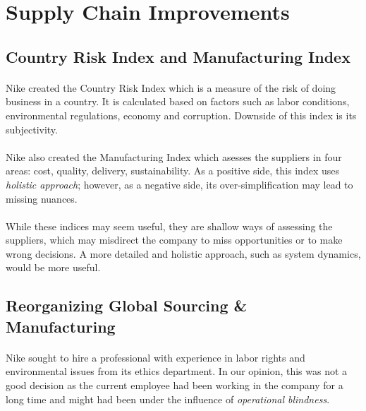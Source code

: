 \section{Supply Chain Improvements}

\subsection{Country Risk Index and Manufacturing Index}

\paragraph{} Nike created the Country Risk Index which is a measure of the risk of doing business in a country. It is calculated based on factors such as labor conditions, environmental regulations, economy and corruption. Downside of this index is its subjectivity.

\paragraph{} Nike also created the Manufacturing Index which asesses the suppliers in four areas: cost, quality, delivery, sustainability. As a positive side, this index uses \textit{holistic approach}; however, as a negative side, its over-simplification may lead to missing nuances.

\paragraph{} While these indices may seem useful, they are shallow ways of assessing the suppliers, which may misdirect the company to miss opportunities or to make wrong decisions. A more detailed and holistic approach, such as system dynamics, would be more useful. 

\subsection{Reorganizing Global Sourcing \& Manufacturing}

\paragraph{} Nike sought to hire a professional with experience in labor rights and environmental issues from its ethics department. In our opinion, this was not a good decision as the current employee had been working in the company for a long time and might had been under the influence of \textit{operational blindness}.
